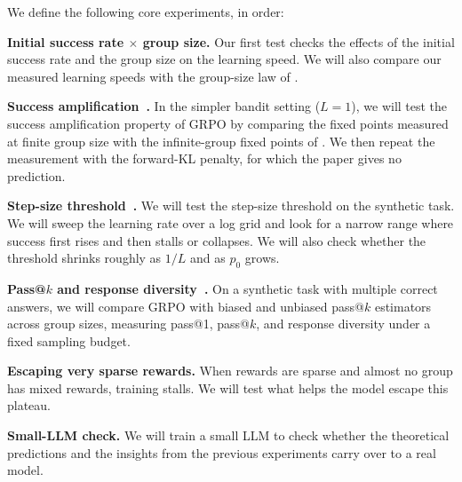 \documentclass{article}
\theoremstyle{definition}
\newcommand{\1}{\mathbf{1}}
\begin{document}
We define the following core experiments, in order:
\begin{description}[leftmargin=2.2em, labelindent=0em]
  \item[E1] \textbf{Initial success rate $\times$ group size.} Our first test
    checks the effects of the initial success rate and the group size on the
    learning speed. We will also compare our measured learning speeds with
    the group-size law of \citet{bay2026grpostd}.

  \item[E2] \textbf{Success amplification~\citep{mroueh2025rlvr}.} In the
    simpler bandit setting ($L = 1$), we will test the success amplification
    property of GRPO by comparing the fixed points measured at finite group
    size with the infinite-group fixed points of \citet{mroueh2025rlvr}. We
    then repeat the measurement with the forward-KL penalty, for which the
    paper gives no prediction.

  \item[E3] \textbf{Step-size threshold~\citep{suk2025gradientgap}.} We will
    test the step-size threshold on the synthetic task. We will sweep the
    learning rate over a log grid and look for a narrow range where success
    first rises and then stalls or collapses. We will also check whether the
    threshold shrinks roughly as $1/L$ and as $p_0$ grows.

  \item[E4] \textbf{Pass@$k$ and response
    diversity~\citep{thrampoulidis2026passk}.} On a synthetic task with
    multiple correct answers, we will compare GRPO with biased and unbiased
    pass@$k$ estimators across group sizes, measuring pass@1, pass@$k$, and
    response diversity under a fixed sampling budget.

  \item[E5] \textbf{Escaping very sparse rewards.} When rewards are sparse and
    almost no group has mixed rewards, training stalls. We will test what helps
    the model escape this plateau.

  \item[E6] \textbf{Small-LLM check.} We will train a small LLM to check
    whether the theoretical predictions and the insights from the previous
    experiments carry over to a real model.
\end{description}



\end{document}
